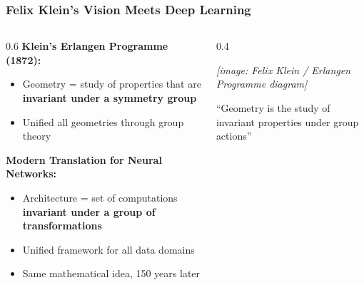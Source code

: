 \begin{frame}[fragile]\frametitle{Felix Klein's Vision Meets Deep Learning}

\begin{columns}
\begin{column}{0.6\textwidth}
\textbf{Klein's Erlangen Programme (1872):}
\begin{itemize}
\item Geometry = study of properties that are \textbf{invariant under a symmetry group}
\item Unified all geometries through group theory
\end{itemize}

\vspace{0.4cm}
\textbf{Modern Translation for Neural Networks:}
\begin{itemize}
\item Architecture = set of computations \textbf{invariant under a group of transformations}
\item Unified framework for all data domains
\item Same mathematical idea, 150 years later
\end{itemize}
\end{column}
\begin{column}{0.4\textwidth}
\begin{center}
\textit{[image: Felix Klein / Erlangen Programme diagram]}

\vspace{0.4cm}
{\small ``Geometry is the study of invariant properties under group actions''}
\end{center}
\end{column}
\end{columns}

\end{frame}

